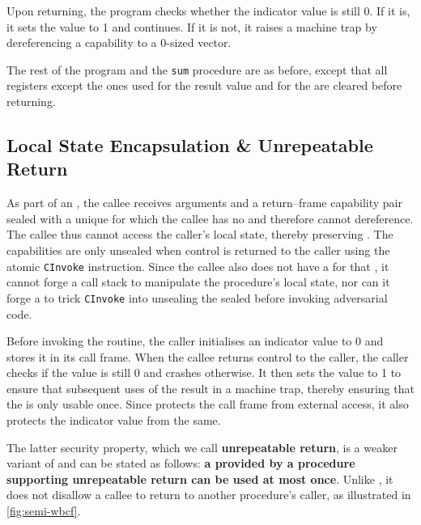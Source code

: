 \documentclass[main.tex]{subfiles}
\begin{document}
Upon returning, the program checks whether the indicator value is still 0. If it is, it sets the value to 1 and continues. If it is not, it raises a machine trap by dereferencing a capability to a 0-sized vector.

The rest of the program and the \texttt{sum} procedure are \lowered{} as before, except that all registers except the ones used for the result value and for the  are cleared before returning.


\subsection{Local State Encapsulation \& Unrepeatable Return}
As part of an , the callee receives arguments and a return–frame capability pair sealed with a unique  for which the callee has no  and therefore cannot dereference. The callee thus cannot access the caller's local state, thereby preserving . The capabilities are only unsealed when control is returned to the caller using the atomic \texttt{CInvoke} instruction. Since the callee also does not have a  for that , it cannot forge a call stack to manipulate the procedure's local state, nor can it forge a  to trick \texttt{CInvoke} into unsealing the sealed  before invoking adversarial code.

Before invoking the  routine, the caller initialises an indicator value to 0 and stores it in its call frame. When the callee returns control to the caller, the caller checks if the value is still 0 and crashes otherwise. It then sets the value to 1 to ensure that subsequent uses of the  result in a machine trap, thereby ensuring that the  is only usable once. Since  protects the call frame from external access, it also protects the indicator value from the same.

The latter security property, which we call \textbf{unrepeatable return}, is a weaker variant of  and can be stated as follows: \textbf{a  provided by a procedure supporting unrepeatable return can be used at most once}. Unlike , it does not disallow a callee to return to another procedure's caller, as illustrated in \cref{fig:semi-wbcf}.
\end{document}
